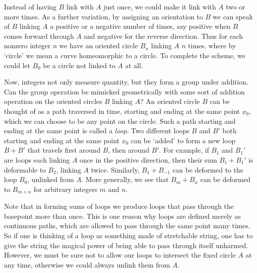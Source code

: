 Instead of having $B$ link with $A$ just once, we could make it link with $A$ two or
more times. As a further variation, by assigning an orientation to $B$ we can speak of
$B$ linking $A$ a positive or a negative number of times, say positive when $B$ comes
forward through $A$ and negative for the reverse direction. Thus for each nonzero
integer $n$ we have an oriented circle $B_n$ linking $A$ $n$ times, where by `circle' we mean
a curve homeomorphic to a circle. To complete the scheme, we could let $B_0$ be a circle
not linked to $A$ at all.



Now, integers not only measure quantity, but they form a group under addition.
Can the group operation be mimicked geometrically with some sort of addition
operation on the oriented circles $B$ linking $A$? An oriented circle $B$ can be thought
of as a path traversed in time, starting and ending at the same point $x_0$, which we
can choose to be any point on the circle. Such a path starting and ending at the same
point is called a \textit{loop}. Two different loops $B$ and $B'$ both starting and ending at
the same point $x_0$ can be `added' to form a new loop $B + B'$ that travels first around
$B$, then around $B'$. For example, if $B_1$ and $B_1'$ are loops each linking $A$ once in
the positive direction, then their sum $B_1 + B_1'$ is deformable to $B_2$, linking $A$ twice.
Similarly, $B_1 + B_{-1}$ can be deformed to the loop $B_0$, unlinked from $A$. More
generally, we see that $B_m + B_n$ can be deformed to $B_{m+n}$ for arbitrary integers $m$
and $n$.



Note that in forming sums of loops we produce loops that pass through the
basepoint more than once. This is one reason why loops are defined merely as
continuous paths, which are allowed to pass through the same point many times. So
if one is thinking of a loop as something made of stretchable string, one has to give
the string the magical power of being able to pass through itself unharmed. However,
we must be sure not to allow our loops to intersect the fixed circle $A$ at any time,
otherwise we could always unlink them from $A$.

